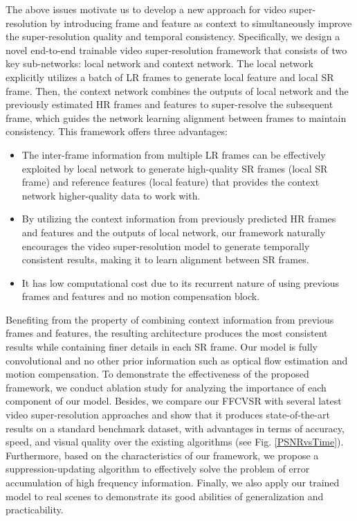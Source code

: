 \documentclass[letterpaper]{article} %
\begin{document}
The above issues motivate us to develop a new approach for video super-resolution by introducing frame and feature as context to simultaneously improve the super-resolution quality and temporal consistency. Specifically, we design a novel end-to-end trainable video super-resolution framework that consists of two key sub-networks: local network and context network. The local network explicitly utilizes a batch of LR frames to generate local feature and local SR frame. Then, the context network combines the outputs of local network and the previously estimated HR frames and features to super-resolve the subsequent frame, which guides the network learning alignment between frames to maintain consistency. This framework offers three advantages:


\begin{itemize}
\item The inter-frame information from multiple LR frames can be effectively exploited by local network to generate high-quality SR frames (local SR frame) and reference features (local feature) that provides the context network higher-quality data to work with.
\item By utilizing the context information from previously predicted HR frames and features and the outputs of local network, our framework naturally encourages the video super-resolution model to generate temporally consistent results, making it to learn alignment between SR frames.
\item It has low computational cost due to its recurrent nature of using previous frames and features and no motion compensation block.
\end{itemize}


Benefiting from the property of combining context information from previous frames and features, the resulting architecture produces the most consistent results while containing finer details in each SR frame. Our model is fully convolutional and no other prior information such as optical flow estimation and motion compensation. To demonstrate the effectiveness of the proposed framework, we conduct ablation study for analyzing the importance of each component of our model. Besides, we compare our FFCVSR with several latest video super-resolution approaches and show that it produces state-of-the-art results on a standard benchmark dataset, with advantages in terms of accuracy, speed, and visual quality over the existing algorithms (see Fig. \ref{PSNRvsTime}). Furthermore, based on the characteristics of our framework, we propose a suppression-updating algorithm to effectively solve the problem of error accumulation of high frequency information. Finally, we also apply our trained model to real scenes to demonstrate its good abilities of generalization and practicability.
\end{document}
